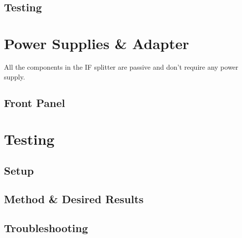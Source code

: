 \documentclass[12pt,a4paper,oneside]{article}
\begin{document}
\subsection{Testing}
\label{sec:Testing}

\section{Power Supplies \& Adapter}
\label{sec:Power}
All the components in the IF splitter are passive and don't require any power supply.


\subsection{Front Panel}      
\label{sec:FrontPannel}

\section{Testing}
\label{sec:Testing}


\subsection{Setup}
\label{sec:Testing_Setup}


\subsection{Method \& Desired Results}
\label{sec:Testing_Method}

\subsection{Troubleshooting}
\label{sec:Testing_Troubleshooting}
\end{document}
